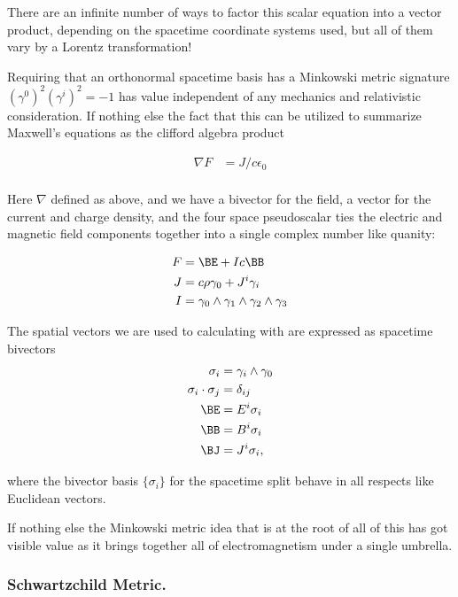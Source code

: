 \documentclass{article}      %
\newcommand{\grad}[0]{\nabla}
\begin{document}
There are an infinite number of ways to factor this scalar equation into a vector product, depending on the spacetime 
coordinate systems used, but all of them vary by a Lorentz transformation!

Requiring that an orthonormal spacetime basis has a Minkowski metric signature $(\gamma^0)^2 (\gamma^i)^2 = -1$ has value
independent of any mechanics and relativistic consideration.  If nothing else the fact that this can be utilized to
summarize Maxwell's equations as the clifford algebra product \cite{doran2003gap}

\begin{align*}
\grad F &= J/c \epsilon_0 \\
\end{align*}

Here $\grad$ defined as above, and we have a bivector for the field, a vector for the current and charge density, and the 
four space pseudoscalar ties the electric and magnetic field components together into a single complex number like quanity:

\begin{align*}
F &= \BE + I c \BB \\
J &= c \rho \gamma_0 + J^i \gamma_i \\
I &= \gamma_0 \wedge \gamma_1 \wedge \gamma_2 \wedge \gamma_3 \\
\end{align*}

The spatial vectors we are used to calculating with are expressed as spacetime bivectors
\begin{align*}
\sigma_i &= \gamma_i \wedge \gamma_0 \\
\sigma_i \cdot \sigma_j &= \delta_{ij} \\
\BE &= E^i \sigma_i \\
\BB &= B^i \sigma_i \\
\BJ &= J^i \sigma_i,
\end{align*}

where the bivector basis $\{\sigma_i\}$ for the spacetime split behave in all respects like Euclidean vectors.

If nothing else the Minkowski metric idea that is at the root of all of this has got visible value as it brings together all
of electromagnetism under a single umbrella.

\subsubsection{ Schwartzchild Metric. } 
\end{document}
